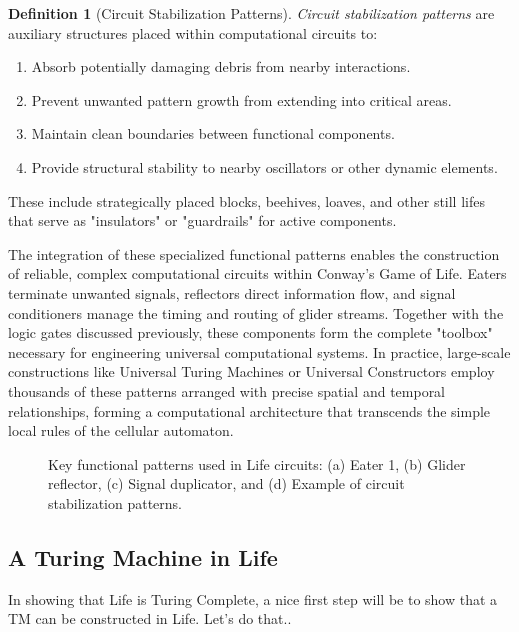 \documentclass{article}
\theoremstyle{definition}
\newtheorem{definition}{Definition}[section]
\theoremstyle{plain}
\theoremstyle{plain}
\begin{document}
\begin{definition}[Circuit Stabilization Patterns]
\textit{Circuit stabilization patterns} are auxiliary structures placed within computational circuits to:
\begin{enumerate}
  \item Absorb potentially damaging debris from nearby interactions.
  \item Prevent unwanted pattern growth from extending into critical areas.
  \item Maintain clean boundaries between functional components.
  \item Provide structural stability to nearby oscillators or other dynamic elements.
\end{enumerate}
These include strategically placed blocks, beehives, loaves, and other still lifes that serve as "insulators" or "guardrails" for active components.
\end{definition}

The integration of these specialized functional patterns enables the construction of reliable, complex computational circuits within Conway's Game of Life. Eaters terminate unwanted signals, reflectors direct information flow, and signal conditioners manage the timing and routing of glider streams. Together with the logic gates discussed previously, these components form the complete "toolbox" necessary for engineering universal computational systems. In practice, large-scale constructions like Universal Turing Machines or Universal Constructors employ thousands of these patterns arranged with precise spatial and temporal relationships, forming a computational architecture that transcends the simple local rules of the cellular automaton.

\begin{figure}[H]
  \centering
  \caption{Key functional patterns used in Life circuits: (a) Eater 1, (b) Glider reflector, (c) Signal duplicator, and (d) Example of circuit stabilization patterns.}
  \label{fig:circuit-components}
\end{figure}



\subsection{A Turing Machine in Life}


In showing that Life is Turing Complete, a nice first step will be to show that a TM can be constructed in Life. Let's do that..
\end{document}
